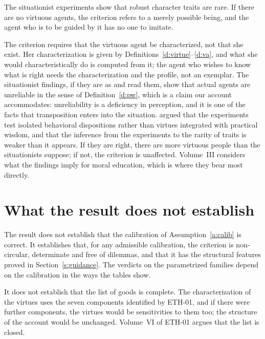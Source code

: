 \documentclass{situationist-preprint}
\begin{document}
\begin{objection}\label{o:situationism}
The situationist experiments show that robust character traits are rare. If there are no virtuous agents, the criterion refers to a merely possible being, and the agent who is to be guided by it has no one to imitate.
\end{objection}

\begin{reply}
The criterion requires that the virtuous agent be characterized, not that she exist. Her characterization is given by Definitions~\ref{d:virtue}--\ref{d:va}, and what she would characteristically do is computed from it; the agent who wishes to know what is right needs the characterization and the profile, not an exemplar. The situationist findings, if they are as \citet{Doris2002} and \citet{Harman1999} read them, show that actual agents are unreliable in the sense of Definition~\ref{d:pw}, which is a claim our account accommodates: unreliability is a deficiency in perception, and it is one of the facts that transposition enters into the situation. \citet{Kamtekar2004} argued that the experiments test isolated behavioral dispositions rather than virtues integrated with practical wisdom, and \citet{Sreenivasan2002} that the inference from the experiments to the rarity of traits is weaker than it appears. If they are right, there are more virtuous people than the situationists suppose; if not, the criterion is unaffected. Volume~III considers what the findings imply for moral education, which is where they bear most directly.
\end{reply}

\section{What the result does not establish}\label{s:limits}

The result does not establish that the calibration of Assumption~\ref{a:calib} is correct. It establishes that, for any admissible calibration, the criterion is non-circular, determinate and free of dilemmas, and that it has the structural features proved in Section~\ref{s:guidance}. The verdicts on the parametrized families depend on the calibration in the ways the tables show.

It does not establish that the list of goods is complete. The characterization of the virtues uses the seven components identified by ETH-01, and if there were further components, the virtues would be sensitivities to them too; the structure of the account would be unchanged. Volume~VI of ETH-01 argues that the list is closed.
\end{document}

